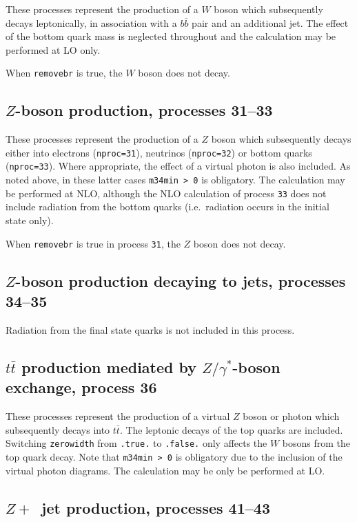 \documentclass[12pt]{article}
\begin{document}
These processes represent the production of a $W$ boson which subsequently
decays leptonically, in association with a $b{\bar b}$ pair and an
additional jet. The effect of the bottom quark mass is neglected throughout
and the calculation may be performed at LO only.

When {\tt removebr} is true, the $W$ boson does not decay.

\subsection{$Z$-boson production, processes 31--33}
\label{subsec:zboson}

These processes represent the production of a $Z$ boson which subsequently
decays either into electrons ({\tt nproc=31}), neutrinos ({\tt nproc=32})
or bottom quarks ({\tt nproc=33}). Where appropriate, the effect of a virtual
photon is also included. As noted above, in these latter cases {\tt m34min > 0}
is obligatory. The calculation may be performed at NLO,
although the NLO calculation of process {\tt 33} does not include radiation
from the bottom quarks (i.e.\ radiation occurs in the initial state only).

When {\tt removebr} is true in process {\tt 31}, the $Z$ boson does not decay.

\subsection{$Z$-boson production decaying to jets, processes 34--35}
Radiation from the final state quarks is not included in this process.

\subsection{$t \bar{t}$ production mediated by $Z/\gamma^*$-boson exchange, process 36}

These processes represent the production of a virtual $Z$ boson or photon 
which subsequently decays into $t \bar{t}$.
The leptonic decays of the top quarks are included.
Switching {\tt zerowidth} from {\tt .true.} to {\tt .false.} only affects
the $W$ bosons from the top quark decay.
Note that {\tt m34min > 0} is obligatory due to the inclusion of the
virtual photon diagrams. The calculation may be only be performed at LO.


\subsection{$Z+$~jet production, processes 41--43}
\label{subsec:zjet}
\end{document}
